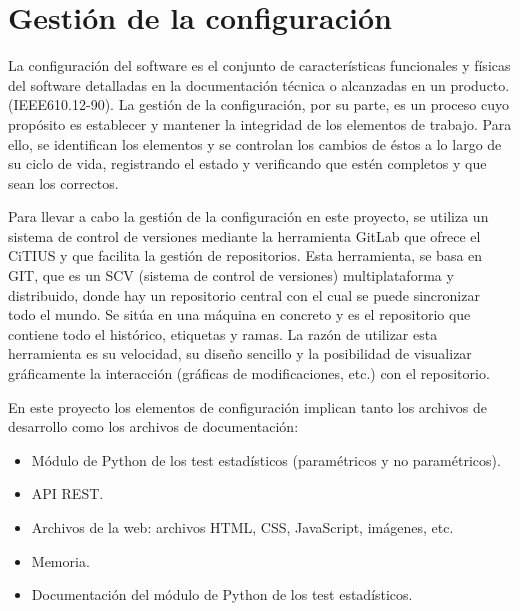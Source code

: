 \section{Gestión de la configuración}
La configuración del software es el conjunto de características funcionales y físicas del software detalladas en la documentación técnica o alcanzadas en un producto. (IEEE610.12-90). La gestión de la configuración, por su parte, es un proceso cuyo propósito es establecer y mantener la integridad de los elementos de trabajo. Para ello, se identifican los elementos y se controlan los cambios de éstos a lo largo de su ciclo de vida, registrando el estado y verificando que estén completos y que sean los correctos.

Para llevar a cabo la gestión de la configuración en este proyecto, se utiliza un sistema de control de versiones mediante la herramienta GitLab que ofrece el CiTIUS \cite{gitlab} y que facilita la gestión de repositorios. Esta herramienta, se basa en GIT, que es un SCV (sistema de control de versiones) multiplataforma y distribuido, donde hay un repositorio central con el cual se puede sincronizar todo el mundo. Se sitúa en una máquina en concreto y es el repositorio que contiene todo el histórico, etiquetas y ramas. La razón de utilizar esta herramienta es su velocidad, su diseño sencillo y la posibilidad de visualizar gráficamente la interacción (gráficas de modificaciones, etc.) con el repositorio.

\noindent
En este proyecto los elementos de configuración implican tanto los archivos de desarrollo como los archivos de documentación:
\begin{itemize}
\item Módulo de Python de los test estadísticos (paramétricos y no paramétricos).
\item API REST.
\item Archivos de la web: archivos HTML, CSS, JavaScript, imágenes, etc.
\item Memoria.
\item Documentación del módulo de Python de los test estadísticos.
\end{itemize}

